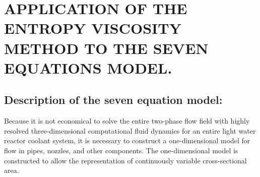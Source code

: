 %
%
%


\chapter{\uppercase {Application of the entropy viscosity method to the seven equations model.}}
\section{Description of the seven equation model:}
Because it is not economical to solve the entire two-phase flow field
with highly resolved three-dimensional computational fluid dynamics for an
entire light water reactor coolant system,
it is necessary to construct a one-dimensional model for flow in
pipes, nozzles, and other components.  The one-dimensional model is
constructed to allow the representation of continuously variable
cross-sectional area.

